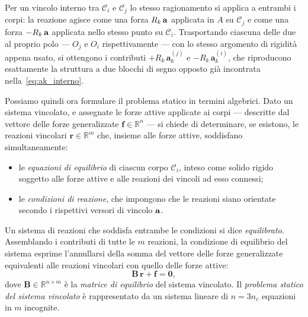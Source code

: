 Per un vincolo interno tra $\mathcal{C}_i$ e $\mathcal{C}_j$ lo
stesso ragionamento si applica a entrambi i corpi: la reazione agisce come una forza
$R_k\,\mathbf{a}$ applicata in $A$ su $\mathcal{C}_j$ e come una forza
$-R_k\,\mathbf{a}$ applicata nello stesso punto su $\mathcal{C}_i$.
Trasportando ciascuna delle due al proprio polo --- $O_j$ e $O_i$
rispettivamente --- con lo stesso argomento di rigidità appena
usato, si ottengono i contributi $+R_k\,\bm{a}_k^{(j)}$ e
$-R_k\,\bm{a}_k^{(i)}$, che riproducono esattamente la struttura
a due blocchi di segno opposto già incontrata
nella~\eqref{eq:ak_interno}.
\bigskip

Possiamo quindi ora formulare il problema statico in termini
algebrici. Dato un sistema vincolato, e assegnate le forze
attive applicate ai corpi --- descritte dal vettore delle
forze generalizzate $\bm{f} \in \mathbb{R}^n$ --- si
chiede di determinare, se esistono, le reazioni vincolari
$\bm{r} \in \mathbb{R}^m$ che, insieme alle forze attive,
soddisfano simultaneamente:
\begin{itemize}[noitemsep]
	\item le \emph{equazioni di equilibrio} di ciascun
	corpo $\mathcal{C}_i$, inteso come solido rigido
	soggetto alle forze attive e alle reazioni dei vincoli
	ad esso connessi;
	\item le \emph{condizioni di reazione}, che impongono
	che le reazioni siano orientate secondo i rispettivi
	versori di vincolo $\mathbf{a}$.
\end{itemize}
Un sistema di reazioni che soddisfa entrambe le condizioni
si dice \emph{equilibrato}.
Assemblando i
contributi di tutte le $m$ reazioni, la condizione di
equilibrio del sistema esprime l'annullarsi della somma
del vettore delle forze generalizzate equivalenti alle
reazioni vincolari con quello delle forze attive:
\begin{equation}\label{eq:eq_globale}
	\bm{B}\,\bm{r} + \bm{f} = \bm{0},
\end{equation}
dove $\bm{B} \in \mathbb{R}^{n \times m}$ è la
\emph{matrice di equilibrio} del sistema vincolato.
Il \emph{problema statico del sistema vincolato} è rappresentato da
un sistema lineare di $n = 3 n_c$ equazioni in $m$
incognite.

